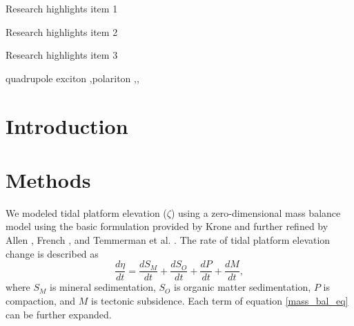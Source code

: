 \documentclass[a4paper,fleqn]{cas-sc}
\begin{document}
\begin{abstract}
This template helps you to create a properly formatted \LaTeX\ manuscript.

\noindent\texttt{\textbackslash begin{abstract}} \dots 
\texttt{\textbackslash end{abstract}} and
\verb+\begin{keyword}+ \verb+...+ \verb+\end{keyword}+ 
which
contain the abstract and keywords respectively. 
Each keyword shall be separated by a \verb+\sep+ command.
\end{abstract}

\begin{highlights}
\item Research highlights item 1
\item Research highlights item 2
\item Research highlights item 3
\end{highlights}

\begin{keywords}
quadrupole exciton \sep polariton \sep \WGM \sep \BEC
\end{keywords}

\maketitle

\section{Introduction}

\section{Methods}

We modeled tidal platform elevation ($\zeta$) using a zero-dimensional mass balance model using the basic formulation provided by Krone \citet{kroneMethodSimulatingMarsh1987} and further refined by Allen \citet{allenSaltmarshGrowthStratification1990}, French \citet{frenchNumericalSimulationVertical1993}, and Temmerman et al. \citet{temmermanModellingLongtermTidal2003,temmermanModellingEstuarineVariations2004}. The rate of tidal platform elevation change is described as
\begin{equation}\label{mass_bal_eq}
	\frac{d \eta}{d t} = \frac{d S_M}{d t} + \frac{d S_O}{d t} + \frac{d P}{d t} + \frac{d M}{d t},
\end{equation}
where $S_M$ is mineral sedimentation, $S_O$ is organic matter sedimentation, $P$ is compaction, and $M$ is tectonic subsidence. Each term of equation \ref{mass_bal_eq} can be further expanded.
\end{document}
